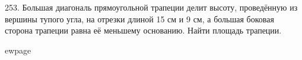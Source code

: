 253. Большая диагональ прямоугольной трапеции делит
высоту, проведённую из вершины тупого угла, на отрезки
длиной 15 см и 9 см, а большая боковая сторона трапеции
равна её меньшему основанию. Найти площадь
трапеции.

ewpage
